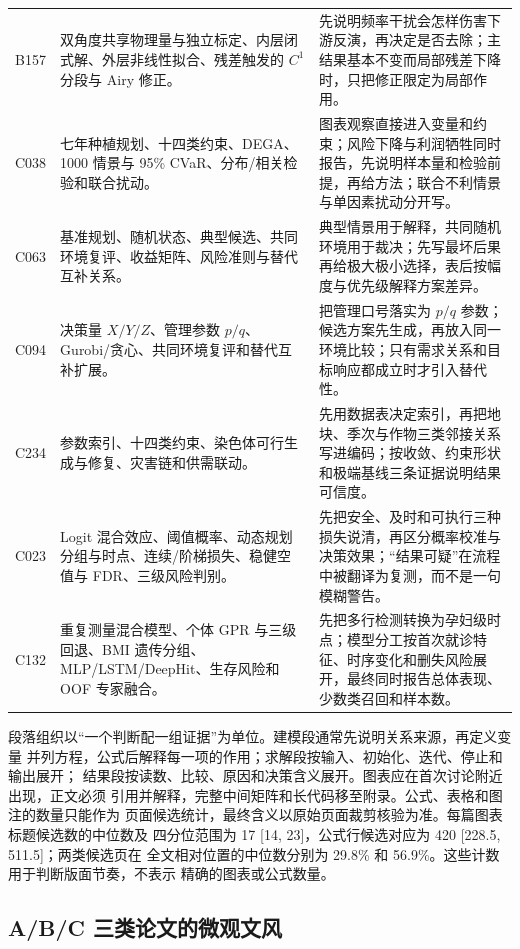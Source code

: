 \documentclass[UTF8,a4paper,12pt]{ctexart}
\begin{document}
\begin{longtable}{p{1.4cm}p{5.2cm}p{7.0cm}}
B157 & 双角度共享物理量与独立标定、内层闭式解、外层非线性拟合、残差触发的 $C^1$ 分段与 Airy 修正。 &
先说明频率干扰会怎样伤害下游反演，再决定是否去除；主结果基本不变而局部残差下降时，只把修正限定为局部作用。\\
C038 & 七年种植规划、十四类约束、DEGA、1000 情景与 95\% CVaR、分布/相关检验和联合扰动。 &
图表观察直接进入变量和约束；风险下降与利润牺牲同时报告，先说明样本量和检验前提，再给方法；联合不利情景与单因素扰动分开写。\\
C063 & 基准规划、随机状态、典型候选、共同环境复评、收益矩阵、风险准则与替代互补关系。 &
典型情景用于解释，共同随机环境用于裁决；先写最坏后果再给极大极小选择，表后按幅度与优先级解释方案差异。\\
C094 & 决策量 $X/Y/Z$、管理参数 $p/q$、Gurobi/贪心、共同环境复评和替代互补扩展。 &
把管理口号落实为 $p/q$ 参数；候选方案先生成，再放入同一环境比较；只有需求关系和目标响应都成立时才引入替代性。\\
C234 & 参数索引、十四类约束、染色体可行生成与修复、灾害链和供需联动。 &
先用数据表决定索引，再把地块、季次与作物三类邻接关系写进编码；按收敛、约束形状和极端基线三条证据说明结果可信度。\\
C023 & Logit 混合效应、阈值概率、动态规划分组与时点、连续/阶梯损失、稳健空值与 FDR、三级风险判别。 &
先把安全、及时和可执行三种损失说清，再区分概率校准与决策效果；“结果可疑”在流程中被翻译为复测，而不是一句模糊警告。\\
C132 & 重复测量混合模型、个体 GPR 与三级回退、BMI 遗传分组、MLP/LSTM/DeepHit、生存风险和 OOF 专家融合。 &
先把多行检测转换为孕妇级时点；模型分工按首次就诊特征、时序变化和删失风险展开，最终同时报告总体表现、少数类召回和样本数。\\
\bottomrule
\end{longtable}

段落组织以“一个判断配一组证据”为单位。建模段通常先说明关系来源，再定义变量
并列方程，公式后解释每一项的作用；求解段按输入、初始化、迭代、停止和输出展开；
结果段按读数、比较、原因和决策含义展开。图表应在首次讨论附近出现，正文必须
引用并解释，完整中间矩阵和长代码移至附录。公式、表格和图注的数量只能作为
页面候选统计，最终含义以原始页面裁剪核验为准。每篇图表标题候选数的中位数及
四分位范围为 17 [14, 23]，公式行候选对应为 420 [228.5, 511.5]；两类候选页在
全文相对位置的中位数分别为 29.8\% 和 56.9\%。这些计数用于判断版面节奏，不表示
精确的图表或公式数量。

\subsection{A/B/C 三类论文的微观文风}
\end{document}

